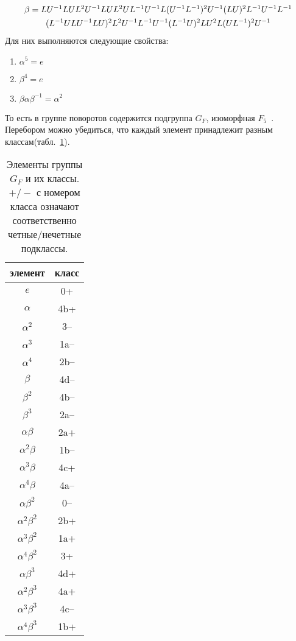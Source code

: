 \documentclass[utf8,a4paper,12pt]{article}
\begin{document}
\begin{multline*} %
$$
\beta=LU^{-1}LUL^2U^{-1}LUL^2UL^{-1}U^{-1}L(U^{-1}L^{-1})^2U^{-1}(LU)^2L^{-1}U^{-1}L^{-1}\\ 
		(L^{-1}ULU^{-1}LU)^2L^2U^{-1}L^{-1}U^{-1}(L^{-1}U)^2LU^2L(UL^{-1})^2U^{-1}
$$
\end{multline*}
Для них выполняются следующие свойства:
\begin{enumerate}
\item $\alpha^5=e$
\item $\beta^4=e$
\item $\beta\alpha\beta^{-1}=\alpha^2$
\end{enumerate}
То есть в группе поворотов содержится подгруппа $G_F$, изоморфная $F_5$~\cite{dummit}. Перебором можно убедиться, что каждый элемент принадлежит разным классам(табл.~\ref{elt}).
\begin{table}[ht]
\begin{center}
  \begin{tabular}{| c | c |}
    \hline
    элемент & класс\\\hline
        $e$ & 0+  \\\hline
        $\alpha$ & 4b+ \\\hline
      $\alpha^2$ & 3-- \\\hline
      $\alpha^3$ & 1a--\\\hline
      $\alpha^4$ & 2b--\\\hline
        $\beta$ & 4d--\\\hline
      $\beta^2$ & 4b--\\\hline
      $\beta^3$ & 2a--\\\hline
       $\alpha\beta$ & 2a+ \\\hline
     $\alpha^2\beta$ & 1b--\\\hline
     $\alpha^3\beta$ & 4c+ \\\hline
     $\alpha^4\beta$ & 4a--\\\hline
     $\alpha\beta^2$ & 0-- \\\hline
   $\alpha^2\beta^2$ & 2b+ \\\hline
   $\alpha^3\beta^2$ & 1a+ \\\hline
   $\alpha^4\beta^2$ & 3+  \\\hline
     $\alpha\beta^3$ & 4d+ \\\hline
   $\alpha^2\beta^3$ & 4a+ \\\hline
   $\alpha^3\beta^3$ & 4c--\\\hline
   $\alpha^4\beta^3$ & 1b+ \\\hline
  \end{tabular}
  \end{center}
  \caption{Элементы группы $G_F$ и их классы. $+/-$ с номером класса означают соответственно четные/нечетные подклассы.\label{elt}}
\end{table}
\end{document}
